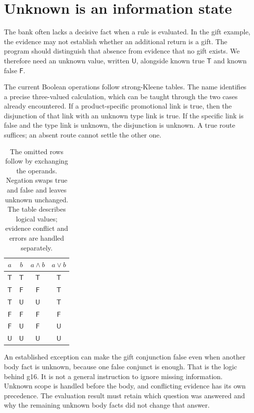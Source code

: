 \documentclass[12pt,a4paper,oneside,openany]{book}
\newcommand{\True}{\mathsf{T}}
\newcommand{\False}{\mathsf{F}}
\newcommand{\Unknown}{\mathsf{U}}
\begin{document}
\section{Unknown is an information state}
\label{sec:proof-unknown}
The bank often lacks a decisive fact when a rule is evaluated. In the gift
example, the evidence may not establish whether an additional return is a gift.
The program should distinguish that absence from evidence that no gift exists.
We therefore need an unknown value, written $\Unknown$, alongside known true
$\True$ and known false $\False$.

The current Boolean operations follow strong-Kleene tables. The name identifies
a precise three-valued calculation, which can be taught through the two cases
already encountered. If a product-specific promotional link is true, then the
disjunction of that link with an unknown type link is true. If the specific
link is false and the type link is unknown, the disjunction is unknown. A true
route suffices; an absent route cannot settle the other one.

\begin{table}[htbp]
\centering
\begin{tabular}{cc|cc}
\toprule
$a$ & $b$ & $a\land b$ & $a\lor b$\\
\midrule
$\True$ & $\True$ & $\True$ & $\True$\\
$\True$ & $\False$ & $\False$ & $\True$\\
$\True$ & $\Unknown$ & $\Unknown$ & $\True$\\
$\False$ & $\False$ & $\False$ & $\False$\\
$\False$ & $\Unknown$ & $\False$ & $\Unknown$\\
$\Unknown$ & $\Unknown$ & $\Unknown$ & $\Unknown$\\
\bottomrule
\end{tabular}
\caption{The omitted rows follow by exchanging the operands. Negation swaps
true and false and leaves unknown unchanged. The table describes logical values;
evidence conflict and errors are handled separately.}
\label{tab:kleene}
\end{table}

An established exception can make the gift conjunction false even when another
body fact is unknown, because one false conjunct is enough. That is the logic
behind g16. It is not a general instruction to ignore missing information.
Unknown scope is handled before the body, and conflicting evidence has its own
precedence. The evaluation result must retain which question was answered and
why the remaining unknown body facts did not change that answer.
\end{document}
